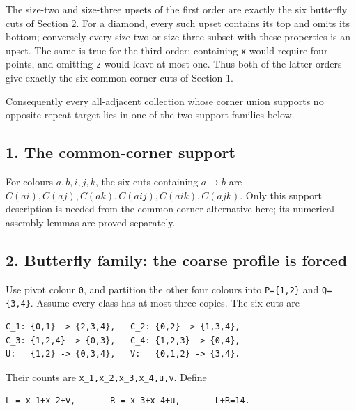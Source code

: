 \documentclass[
  10pt,
]{article}
\begin{document}
The size-two and size-three upsets of the first order are exactly the
six butterfly cuts of Section 2. For a diamond, every such upset
contains its top and omits its bottom; conversely every size-two or
size-three subset with these properties is an upset. The same is true
for the third order: containing \texttt{x} would require four points,
and omitting \texttt{z} would leave at most one. Thus both of the latter
orders give exactly the six common-corner cuts of Section 1.

Consequently every all-adjacent collection whose corner union supports
no opposite-repeat target lies in one of the two support families below.

\hypertarget{the-common-corner-support}{%
\subsection*{1. The common-corner
support}\label{the-common-corner-support}}

For colours \(a,b,i,j,k\), the six cuts containing \(a\to b\) are
\(C(ai),C(aj),C(ak),C(aij),C(aik),C(ajk)\). Only this support
description is needed from the common-corner alternative here; its
numerical assembly lemmas are proved separately.

\hypertarget{butterfly-family-the-coarse-profile-is-forced}{%
\subsection*{2. Butterfly family: the coarse profile is
forced}\label{butterfly-family-the-coarse-profile-is-forced}}

Use pivot colour \texttt{0}, and partition the other four colours into
\texttt{P=\{1,2\}} and \texttt{Q=\{3,4\}}. Assume every class has at
most three copies. The six cuts are

\begin{verbatim}
C_1: {0,1} -> {2,3,4},   C_2: {0,2} -> {1,3,4},
C_3: {1,2,4} -> {0,3},   C_4: {1,2,3} -> {0,4},
U:   {1,2} -> {0,3,4},   V:   {0,1,2} -> {3,4}.
\end{verbatim}

Their counts are \texttt{x\_1,x\_2,x\_3,x\_4,u,v}. Define

\begin{verbatim}
L = x_1+x_2+v,       R = x_3+x_4+u,       L+R=14.
\end{verbatim}
\end{document}

